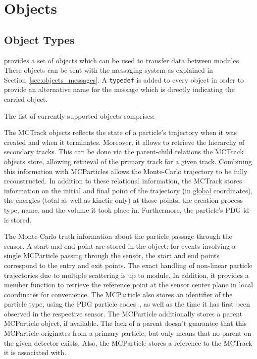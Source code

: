\chapter{Objects}
\label{ch:objects}

\section{Object Types}
\label{sec:objtypes}

\apsq provides a set of objects which can be used to transfer data between modules.
These objects can be sent with the messaging system as explained in Section~\ref{sec:objects_messages}.
A \texttt{typedef} is added to every object in order to provide an alternative name for the message which is directly indicating the carried object.

The list of currently supported objects comprises:


The MCTrack objects reflects the state of a particle's trajectory when it was created and when it terminates.
Moreover, it allows to retrieve the hierarchy of secondary tracks.
This can be done via the parent-child relations the MCTrack objects store, allowing retrieval of the primary track for a given track.
Combining this information with MCParticles allows the Monte-Carlo trajectory to be fully reconstructed.
In addition to these relational information, the MCTrack stores information on the initial and final point of the trajectory (in \underline{global} coordinates), the energies (total as well as kinetic only) at those points, the creation process type, name, and the volume it took place in.
Furthermore, the particle's PDG id is stored.

The Monte-Carlo truth information about the particle passage through the sensor.
A start and end point are stored in the object: for events involving a single MCParticle passing through the sensor, the start and end points correspond to the entry and exit points.
The exact handling of non-linear particle trajectories due to multiple scattering is up to module.
In addition, it provides a member function to retrieve the reference point at the sensor center plane in local coordinates for convenience.
The MCParticle also stores an identifier of the particle type, using the PDG particle codes~\cite{pdg}, as well as the time it has first been observed in the respective sensor.
The MCParticle additionally stores a parent MCParticle object, if available.
The lack of a parent doesn't guarantee that this MCParticle originates from a primary particle, but only means that no parent on the given detector exists.
Also, the MCParticle stores a reference to the MCTrack it is associated with.

